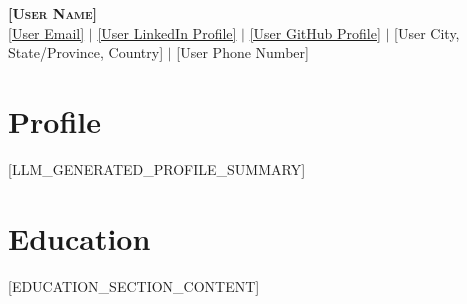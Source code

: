 \documentclass[letterpaper,10pt]{article}
\makeatletter
\newcommand{\resumeItem}[1]{
  \item\small{
    {#1 \vspace{-2pt}}
  }
}
\newcommand{\resumeSubheading}[4]{
  \vspace{-2pt}\item
    \begin{tabular*}{0.97\textwidth}[t]{l@{\extracolsep{\fill}}r}
      \textbf{#1} & #2 \\
      \textit{\small#3} & \textit{\small #4} \\
    \end{tabular*}\vspace{-7pt}
}
\newcommand{\resumeSubHeadingListStart}{\begin{itemize}[leftmargin=0.15in, label={}]}
\newcommand{\resumeSubHeadingListEnd}{\end{itemize}}
\newcommand{\resumeItemListStart}{\begin{itemize}}
\newcommand{\resumeItemListEnd}{\end{itemize}\vspace{-5pt}}
\makeatother
\begin{document}
{\raggedright
    \begin{center}
        \textbf{\large \scshape [User Name]} \\[0.5em] %
        
        \small 
        \faAt \hspace{.5pt} \href{mailto:[User Email]}{[User Email]} $|$
        \faLinkedinSquare \hspace{.5pt} \href{[User LinkedIn URL]}{[User LinkedIn Profile]} $|$
        \faGithub \hspace{.5pt} \href{[User GitHub URL]}{[User GitHub Profile]} $|$
        \faMapMarker \hspace{.5pt} {[User City, State/Province, Country]} $|$
        \faPhone \hspace{.5pt} {[User Phone Number]}
    \end{center}
}

\section{Profile}
\begin{itemize}[leftmargin=0.15in, label={}]
    \small{\item{
        [LLM_GENERATED_PROFILE_SUMMARY]
    }}
\end{itemize}

\section{Education}
\vspace{3pt}
\resumeSubHeadingListStart
    [EDUCATION_SECTION_CONTENT]
\resumeSubHeadingListEnd

\end{document}
